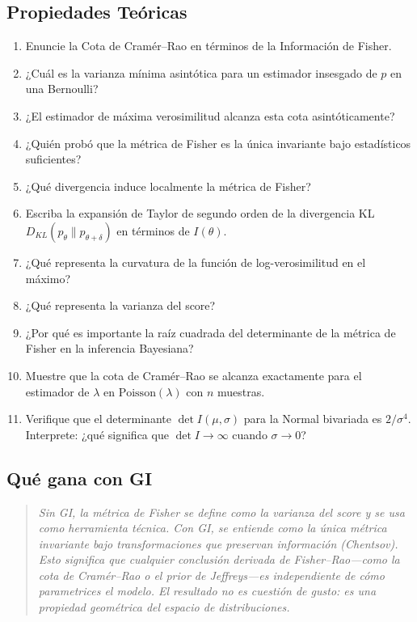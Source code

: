 \subsection*{Propiedades Teóricas}
\begin{enumerate}[resume]
	\item[$\star$] Enuncie la Cota de Cramér--Rao en términos de la Información de Fisher.
	\item[$\star$] ¿Cuál es la varianza mínima asintótica para un estimador insesgado de $p$ en una Bernoulli?
	\item[$\star$] ¿El estimador de máxima verosimilitud alcanza esta cota asintóticamente?
	\item[$\star$] ¿Quién probó que la métrica de Fisher es la única invariante bajo estadísticos suficientes?
	\item[$\star$] ¿Qué divergencia induce localmente la métrica de Fisher?
	\item[$\star\star$] Escriba la expansión de Taylor de segundo orden de la divergencia KL $D_{KL}(p_\theta \| p_{\theta+\delta})$ en términos de $I(\theta)$.
	\item[$\star\star$] ¿Qué representa la curvatura de la función de log-verosimilitud en el máximo?
	\item[$\star\star$] ¿Qué representa la varianza del score?
	\item[$\star\star\star$] ¿Por qué es importante la raíz cuadrada del determinante de la métrica de Fisher en la inferencia Bayesiana?
	\item[$\star\star\star$] Muestre que la cota de Cramér--Rao se alcanza exactamente para el estimador de $\lambda$ en $\mathrm{Poisson}(\lambda)$ con $n$ muestras.
	\item[$\star\star\star$] Verifique que el determinante $\det I(\mu, \sigma)$ para la Normal bivariada es $2/\sigma^4$. Interprete: ¿qué significa que $\det I \to \infty$ cuando $\sigma \to 0$?
\end{enumerate}

\subsection*{Qué gana con GI}
\begin{quote}
	\itshape
	Sin GI, la métrica de Fisher se define como la varianza del score y se usa como herramienta técnica.  Con GI, se entiende como la \emph{única} métrica invariante bajo transformaciones que preservan información (Chentsov).  Esto significa que cualquier conclusión derivada de Fisher--Rao---como la cota de Cramér--Rao o el prior de Jeffreys---es \emph{independiente de cómo parametrices el modelo}.  El resultado no es cuestión de gusto: es una propiedad geométrica del espacio de distribuciones.
\end{quote}
